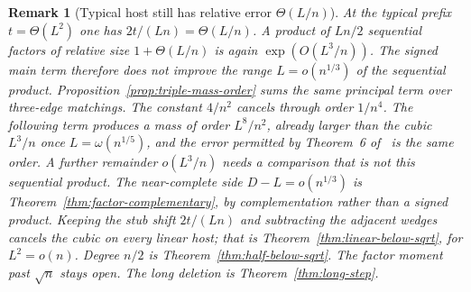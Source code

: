 \documentclass[11pt]{article}
\newtheorem{remark}[theorem]{Remark}
\begin{document}
\begin{remark}[Typical host still has relative error \(\Theta(L/n)\)]
\label{rem:signed-typical}
At the typical prefix \(t=\Theta(L^2)\) one has \(2t/(Ln)=\Theta(L/n)\).
A product of \(Ln/2\) sequential factors of relative size \(1+\Theta(L/n)\)
is again \(\exp(O(L^3/n))\).
The signed main term therefore does not improve the range
\(L=o(n^{1/3})\) of the sequential product.
Proposition~\ref{prop:triple-mass-order} sums the same principal term over
three-edge matchings. The constant \(4/n^2\) cancels through order \(1/n^4\).
The following term produces a mass of order \(L^8/n^2\), already larger than
the cubic \(L^3/n\) once \(L=\omega(n^{1/5})\), and the error permitted by
Theorem~6 of~\cite{Gao20} is the same order. A further remainder \(o(L^3/n)\)
needs a comparison that is not this sequential product.
The near-complete side \(D-L=o(n^{1/3})\) is Theorem~\ref{thm:factor-complementary},
by complementation rather than a signed product.
Keeping the stub shift \(2t/(Ln)\) and subtracting the adjacent wedges cancels
the cubic on every linear host; that is Theorem~\ref{thm:linear-below-sqrt},
for \(L^2=o(n)\). Degree \(n/2\) is
Theorem~\ref{thm:half-below-sqrt}.
The factor moment past \(\sqrt{n}\) stays open.
The long deletion is Theorem~\ref{thm:long-step}.
\end{remark}
\end{document}

